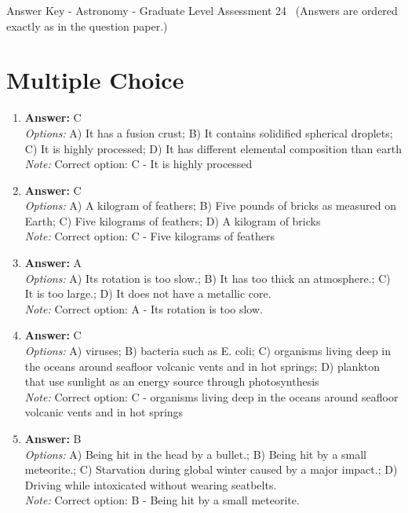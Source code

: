 \documentclass[12pt]{article}
\begin{document}
\begin{center}
Answer Key - Astronomy - Graduate Level Assessment 24 \
\small (Answers are ordered exactly as in the question paper.)
\end{center}

\section*{Multiple Choice}
\begin{enumerate}[label=\arabic*.]
\item \textbf{Answer:} C
\\ \textit{Options:} A) It has a fusion crust; B) It contains solidified spherical droplets; C) It is highly processed; D) It has different elemental composition than earth
\\ \textit{Note:} Correct option: C - It is highly processed
\item \textbf{Answer:} C
\\ \textit{Options:} A) A kilogram of feathers; B) Five pounds of bricks as measured on Earth; C) Five kilograms of feathers; D) A kilogram of bricks
\\ \textit{Note:} Correct option: C - Five kilograms of feathers
\item \textbf{Answer:} A
\\ \textit{Options:} A) Its rotation is too slow.; B) It has too thick an atmosphere.; C) It is too large.; D) It does not have a metallic core.
\\ \textit{Note:} Correct option: A - Its rotation is too slow.
\item \textbf{Answer:} C
\\ \textit{Options:} A) viruses; B) bacteria such as E. coli; C) organisms living deep in the oceans around seafloor volcanic vents and in hot springs; D) plankton that use sunlight as an energy source through photosynthesis
\\ \textit{Note:} Correct option: C - organisms living deep in the oceans around seafloor volcanic vents and in hot springs
\item \textbf{Answer:} B
\\ \textit{Options:} A) Being hit in the head by a bullet.; B) Being hit by a small meteorite.; C) Starvation during global winter caused by a major impact.; D) Driving while intoxicated without wearing seatbelts.
\\ \textit{Note:} Correct option: B - Being hit by a small meteorite.
\end{enumerate}
\end{document}
